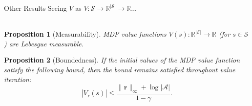 \documentclass{beamer}
\newtheorem{proposition}{Proposition}
\newcommand{\Kuu}{\mathbf{K}_{\mathbf{u},\mathbf{u}}}
\newcommand{\Kru}{\mathbf{K}_{\mathbf{r},\mathbf{u}}}
\newcommand{\rinf}{\lVert \mathbf{r} \rVert_\infty}
\newcommand{\vbound}{\frac{\rinf + \log|\mathcal{A}|}{1 - \gamma}}
\begin{document}
\begin{frame}{Other Results}
  Seeing $V$ as $V \colon \mathcal{S} \to \mathbb{R}^{|\mathcal{S}|} \to
  \mathbb{R}$... \\~\\

  \begin{proposition}[Measurability]
    MDP value functions $V(s) \colon \mathbb{R}^{|\mathcal{S}|} \to \mathbb{R}$
    (for $s \in \mathcal{S}$) are Lebesgue measurable.
  \end{proposition}
  \begin{proposition}[Boundedness]
    If the initial values of the MDP value function satisfy the following
    bound, then the bound remains satisfied throughout value iteration:
    \[
      |V_{\mathbf{r}}(s)| \le \vbound.
    \]
  \end{proposition}
\end{frame}


\end{document}
